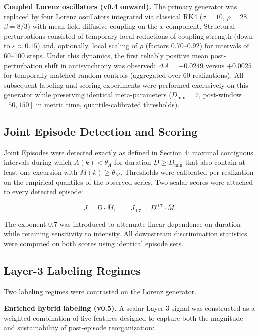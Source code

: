\textbf{Coupled Lorenz oscillators (v0.4 onward).} The primary generator was replaced by four Lorenz oscillators integrated via classical RK4 (\(\sigma = 10\), \(\rho = 28\), \(\beta = 8/3\)) with mean-field diffusive coupling on the \(x\)-component. Structural perturbations consisted of temporary local reductions of coupling strength (down to \(\varepsilon \approx 0.15\)) and, optionally, local scaling of \(\rho\) (factors 0.70--0.92) for intervals of 60--100 steps. Under this dynamics, the first reliably positive mean post-perturbation shift in antisynchrony was observed: \(\Delta A = +0.0249\) versus \(+0.0025\) for temporally matched random controls (aggregated over 60 realizations). All subsequent labeling and scoring experiments were performed exclusively on this generator while preserving identical meta-parameters (\(D_{\min} = 7\), post-window \([50, 150]\) in metric time, quantile-calibrated thresholds).

\subsection{Joint Episode Detection and Scoring}

Joint Episodes were detected exactly as defined in Section 4: maximal contiguous intervals during which \(A(k) < \theta_A\) for duration \(D \geq D_{\min}\) that also contain at least one excursion with \(M(k) \geq \theta_M\). Thresholds were calibrated per realization on the empirical quantiles of the observed series. Two scalar scores were attached to every detected episode:

\[
J = D \cdot \overline{M}, \qquad J_{0.7} = D^{0.7} \cdot \overline{M}.
\]

The exponent 0.7 was introduced to attenuate linear dependence on duration while retaining sensitivity to intensity. All downstream discrimination statistics were computed on both scores using identical episode sets.

\subsection{Layer-3 Labeling Regimes}

Two labeling regimes were contrasted on the Lorenz generator.

\textbf{Enriched hybrid labeling (v0.5).} A scalar Layer-3 signal was constructed as a weighted combination of five features designed to capture both the magnitude and sustainability of post-episode reorganization:

